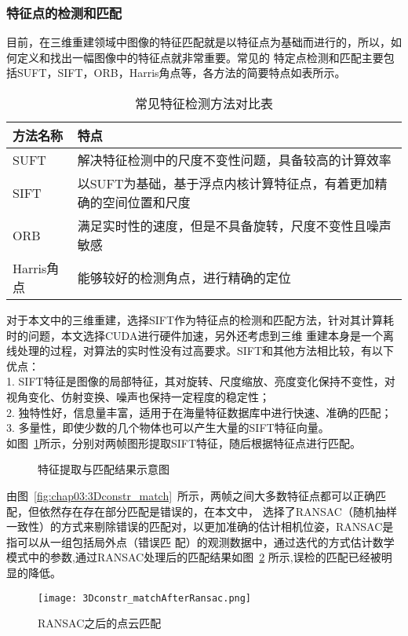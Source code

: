 \subsubsection{特征点的检测和匹配} 
\label{sec:3.2.2.1}
目前，在三维重建领域中图像的特征匹配就是以特征点为基础而进行的，所以，如何定义和找出一幅图像中的特征点就非常重要。常见的
特定点检测和匹配主要包括SUFT，SIFT，ORB，Harris角点等，各方法的简要特点如表所示。
\begin{table}[h]
    \centering
    \caption{常见特征检测方法对比表}
    \label{tab:Feature}
    \begin{tabular}{C{4.6cm}L{8.4cm}}
    \toprule
    \textbf{方法名称} & \textbf{特点}  \\
    \midrule
    SUFT&解决特征检测中的尺度不变性问题，具备较高的计算效率\\
    SIFT&以SUFT为基础，基于浮点内核计算特征点，有着更加精确的空间位置和尺度\\
    ORB&满足实时性的速度，但是不具备旋转，尺度不变性且噪声敏感\\
    Harris角点&能够较好的检测角点，进行精确的定位\\
    \bottomrule
    \end{tabular}
  \end{table}

对于本文中的三维重建，选择SIFT作为特征点的检测和匹配方法，针对其计算耗时的问题，本文选择CUDA进行硬件加速，另外还考虑到三维
重建本身是一个离线处理的过程，对算法的实时性没有过高要求。SIFT和其他方法相比较，有以下优点：\\
1. SIFT特征是图像的局部特征，其对旋转、尺度缩放、亮度变化保持不变性，对视角变化、仿射变换、噪声也保持一定程度的稳定性；\\
2. 独特性好，信息量丰富，适用于在海量特征数据库中进行快速、准确的匹配；\\
3. 多量性，即使少数的几个物体也可以产生大量的SIFT特征向量。\\
如图~\ref{fig:3Dconstrmatchresult}所示，分别对两帧图形提取SIFT特征，随后根据特征点进行匹配。
\begin{figure}[H]
    \centering
    \vskip0.5cm
    \caption{特征提取与匹配结果示意图}\label{fig:3Dconstrmatchresult}
  \end{figure}
由图~\ref{fig:chap03:3Dconstr_match}~所示，两帧之间大多数特征点都可以正确匹配，但依然存在存在部分匹配是错误的，在本文中，
选择了RANSAC（随机抽样一致性）的方式来剔除错误的匹配对，以更加准确的估计相机位姿，RANSAC是指可以从一组包括局外点（错误匹
配）的观测数据中，通过迭代的方式估计数学模式中的参数,通过RANSAC处理后的匹配结果如图~\ref{fig:3Dconstr_matchAfterRansac}
所示,误检的匹配已经被明显的降低。
\begin{figure}[H] %
  \centering
  \texttt{[image: 3Dconstr\_matchAfterRansac.png]}
  \caption{RANSAC之后的点云匹配}
  \label{fig:3Dconstr_matchAfterRansac}
  \end{figure}
